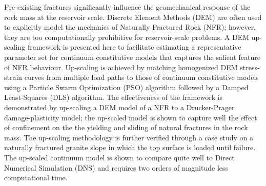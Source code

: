 Pre-existing fractures significantly influence the geomechanical response of the rock mass at the reservoir scale.  Discrete Element Methods (DEM) are often used to explicitly model the mechanics of Naturally Fractured Rock (NFR); however, they are too computationally prohibitive for reservoir-scale problems. A DEM up-scaling framework is presented here to facilitate estimating a representative parameter set for continuum constitutive models that captures the salient feature of NFR behaviour. Up-scaling is achieved by matching homogenized DEM stress-strain curves from multiple load paths to those of continuum constitutive models using a Particle Swarm Optimization (PSO) algorithm followed by a Damped Least-Squares (DLS) algorithm. The effectiveness of the framework is demonstrated by up-scaling a DEM model of a NFR to a Drucker-Prager damage-plasticity model; the up-scaled model is shown to capture well the effect of confinement on the the yielding and sliding of natural fractures in the rock mass. The up-scaling methodology is further verified through a case study on a naturally fractured granite slope in which the top surface is loaded until failure. The up-scaled continuum model is shown to compare quite well to Direct Numerical Simulation (DNS) and requires two orders of magnitude less computational time.